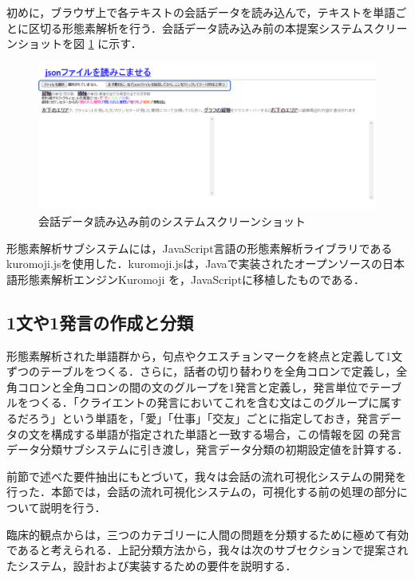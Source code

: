 \documentclass[shuuron]{kuee}
\begin{document}
初めに，ブラウザ上で各テキストの会話データを読み込んで，テキストを単語ごとに区切る形態素解析を行う．会話データ読み込み前の本提案システムスクリーンショットを図
\ref{fig:yomikomimae2}
に示す．
\begin{figure}
  \begin{center}
    \includegraphics[width=\linewidth]{yomikomimae2.png}
  \end{center}
  \caption{会話データ読み込み前のシステムスクリーンショット}
  \label{fig:yomikomimae2}
\end{figure}
形態素解析サブシステムには，JavaScript言語の形態素解析ライブラリであるkuromoji.js\cite{kuromojijs}を使用した．kuromoji.jsは，Javaで実装されたオープンソースの日本語形態素解析エンジンKuromoji
を，JavaScriptに移植したものである．

\subsection{1文や1発言の作成と分類}%
形態素解析された単語群から，句点やクエスチョンマークを終点と定義して1文ずつのテーブルをつくる．さらに，話者の切り替わりを全角コロンで定義し，全角コロンと全角コロンの間の文のグループを1発言と定義し，発言単位でテーブルをつくる．「クライエントの発言においてこれを含む文はこのグループに属するだろう」という単語を，「愛」「仕事」「交友」ごとに指定しておき，発言データの文を構成する単語が指定された単語と一致する場合，この情報を図
の発言データ分類サブシステムに引き渡し，発言データ分類の初期設定値を計算する．


前節で述べた要件抽出にもとづいて，我々は会話の流れ可視化システムの開発を行った．本節では，会話の流れ可視化システムの，可視化する前の処理の部分について説明を行う．


臨床的観点からは，三つのカテゴリーに人間の問題を分類するために極めて有効であると考えられる．上記分類方法から，我々は次のサブセクションで提案されたシステム，設計および実装するための要件を説明する．
\end{document}
